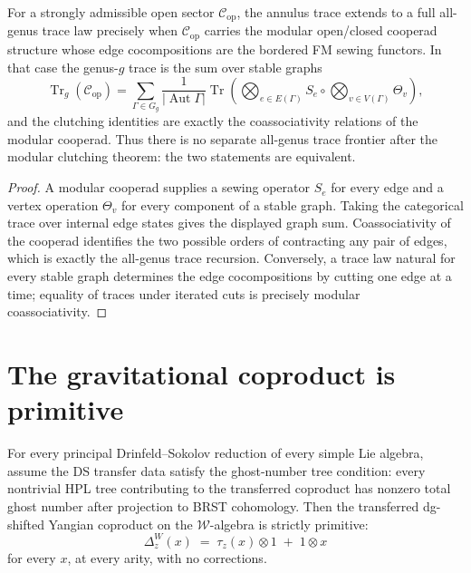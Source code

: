 \documentclass[11pt]{article}
\newcommand{\cC}{\mathcal{C}}
\newcommand{\cW}{\mathcal{W}}
\newcommand{\Tr}{\operatorname{Tr}}
\begin{document}
\begin{theorem}
\label{thm:all-genus-trace-law-modular-clutching}
For a strongly admissible open sector $\cC_{\mathrm{op}}$, the
annulus trace extends to a full all-genus trace law precisely
when $\cC_{\mathrm{op}}$ carries the modular open/closed
cooperad structure whose edge cocompositions are the bordered FM
sewing functors.  In that case the genus-$g$ trace is the sum
over stable graphs
\[
  \Tr_g(\cC_{\mathrm{op}})
  =
  \sum_{\Gamma\in G_{g}}
  \frac{1}{|\operatorname{Aut}\Gamma|}
  \operatorname{Tr}\!\left(
    \bigotimes_{e\in E(\Gamma)} S_e
    \circ
    \bigotimes_{v\in V(\Gamma)} \Theta_v
  \right),
\]
and the clutching identities are exactly the coassociativity
relations of the modular cooperad.  Thus there is no separate
all-genus trace frontier after the modular clutching theorem:
the two statements are equivalent.
\end{theorem}

\begin{proof}
A modular cooperad supplies a sewing operator $S_e$ for every
edge and a vertex operation $\Theta_v$ for every component of a
stable graph.  Taking the categorical trace over internal edge
states gives the displayed graph sum.  Coassociativity of the
cooperad identifies the two possible orders of contracting any
pair of edges, which is exactly the all-genus trace recursion.
Conversely, a trace law natural for every stable graph determines
the edge cocompositions by cutting one edge at a time; equality
of traces under iterated cuts is precisely modular
coassociativity.
\end{proof}


\section{The gravitational coproduct is primitive}
\label{sec:primitive-coproduct}

\begin{theorem}
\label{thm:gravitational-primitivity-wn}
For every principal Drinfeld--Sokolov reduction of every simple
Lie algebra, assume the DS transfer data satisfy the
ghost-number tree condition: every nontrivial HPL tree
contributing to the transferred coproduct has nonzero total ghost
number after projection to BRST cohomology.  Then the transferred
dg-shifted Yangian coproduct on the $\cW$-algebra is strictly
primitive:
\[
\Delta_z^W(x)
\;=\;
\tau_z(x) \otimes 1
\;+\; 1 \otimes x
\]
for every $x$, at every arity, with no corrections.
\end{theorem}
\end{document}
